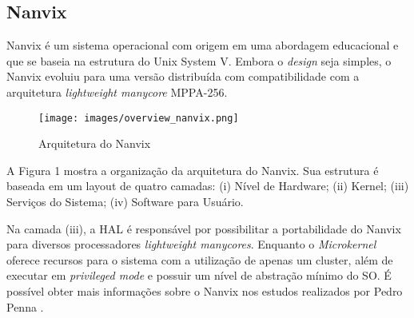 \subsection{Nanvix}

Nanvix é um sistema operacional com origem em uma abordagem educacional \cite{NanvixEdu} e que se baseia na estrutura do Unix System V. Embora o \emph{design} seja simples, o Nanvix evoluiu para uma versão distribuída com compatibilidade com a arquitetura \textit{lightweight manycore} MPPA-256.

\begin{figure}[h!]
    \centering
    \texttt{[image: images/overview\_nanvix.png]}
    \caption{Arquitetura do Nanvix \\ \cite{penna:tel-03545212}}
\end{figure}

A Figura 1 mostra a organização da arquitetura do Nanvix. Sua estrutura é baseada em um layout de quatro camadas: (i) Nível de Hardware; (ii) Kernel; (iii) Serviços do Sistema; (iv) Software para Usuário.

Na camada (iii), a HAL é responsável por possibilitar a portabilidade do Nanvix para diversos processadores \emph{lightweight manycores}. Enquanto o \emph{Microkernel} oferece recursos para o sistema com a utilização de apenas um cluster, além de executar em \emph{privileged mode} e possuir um nível de abstração mínimo do SO. É possível obter mais informações sobre o Nanvix nos estudos realizados por Pedro Penna \cite{penna:tel-03545212}.
